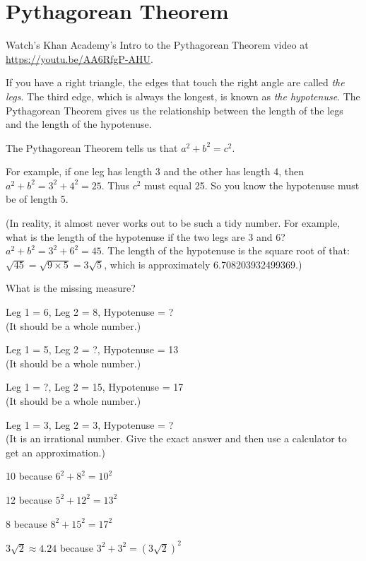 \chapter{Pythagorean Theorem}

Watch's Khan Academy's Intro to the Pythagorean Theorem video at \url{https://youtu.be/AA6RfgP-AHU}.

If you have a right triangle, the edges that touch the right angle are
called \emph{the legs}.  The third edge, which is always the longest,
is known as \emph{the hypotenuse}. The Pythagorean Theorem gives us
the relationship between the length of the legs and the length of the
hypotenuse.


The Pythagorean Theorem tells us that $a^2 + b^2 = c^2$.

For example, if one leg has length 3 and the other has length 4, then
$a^2 + b^2 = 3^2 + 4^2 = 25$. Thus $c^2$ must equal 25. So you know
the hypotenuse must be of length 5.

(In reality, it almost never works out to be such a tidy number. For
example, what is the length of the hypotenuse if the two legs are 3
and 6? $a^2 + b^2 = 3^2 + 6^2 = 45$.  The length of the hypotenuse is
the square root of that: $\sqrt{45} = \sqrt{9 \times 5} = 3 \sqrt{5}$,
which is approximately 6.708203932499369.)

\begin{Exercise}[title={Find the Missing Length}, label=missingsides]
  What is the missing measure?
  \begin{multicols}{2}
Leg 1 = 6, Leg 2 = 8, Hypotenuse = ? \\(It should be a whole number.)

Leg 1 = 5, Leg 2 = ?, Hypotenuse = 13 \\(It should be a whole number.)
  
Leg 1 = ?, Leg 2 = 15, Hypotenuse = 17 \\(It should be a whole number.)

Leg 1 = 3, Leg 2 = 3, Hypotenuse = ? \\(It is an irrational number. Give the exact answer and then use a calculator to get an approximation.)
\end{multicols}
\end{Exercise}
\begin{Answer}[ref=missingsides]
  10 because $6^2 + 8^2 = 10^2$

  12 because $5^2 + 12^2 = 13^2$

  8 because $8^2 + 15^2 = 17^2$

  $3\sqrt{2} \approx 4.24$ because $3^2 + 3^2 = \left(3 \sqrt{2}\right)^2$
\end{Answer}


